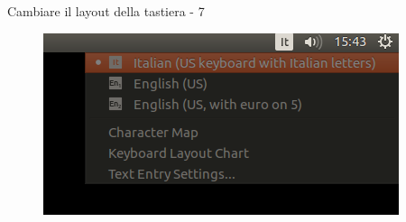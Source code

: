 \begin{frame}{Cambiare il layout della tastiera - 7}

\begin{figure}
\centering
\includegraphics[scale=0.75]{res/img/7}
\end{figure}

\end{frame}